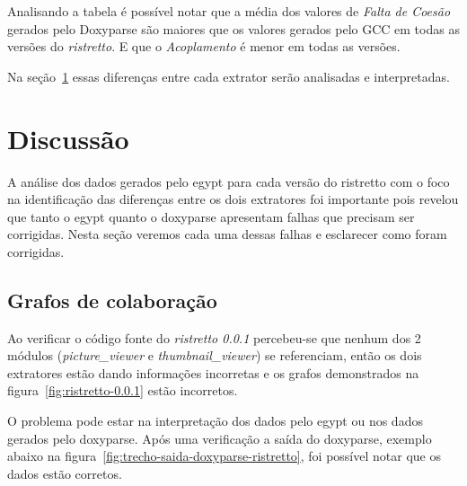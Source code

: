 Analisando a tabela é possível notar que a média dos valores de {\it Falta de
Coesão} gerados pelo Doxyparse são maiores que os valores gerados pelo GCC em
todas as versões do {\it ristretto}. E que o {\it Acoplamento} é menor em todas
as versões.

Na seção~\ref{sec:discussao} essas diferenças entre cada extrator serão
analisadas e interpretadas.

\section{Discussão} \label{sec:discussao}

A análise dos dados gerados pelo egypt para cada versão do ristretto com o foco
na identificação das diferenças entre os dois extratores foi importante pois
revelou que tanto o egypt quanto o doxyparse apresentam falhas que precisam ser
corrigidas. Nesta seção veremos cada uma dessas falhas e esclarecer como foram
corrigidas.

\subsection{Grafos de colaboração}

Ao verificar o código fonte do {\it ristretto 0.0.1} percebeu-se que nenhum dos
2 módulos ({\it picture\_viewer} e {\it thumbnail\_viewer}) se referenciam,
então os dois extratores estão dando informações incorretas e os grafos
demonstrados na figura~\ref{fig:ristretto-0.0.1} estão incorretos.

O problema pode estar na interpretação dos dados pelo egypt ou nos dados
gerados pelo doxyparse. Após uma verificação a saída do doxyparse, exemplo
abaixo na figura~\ref{fig:trecho-saida-doxyparse-ristretto}, foi possível notar
que os dados estão corretos.

